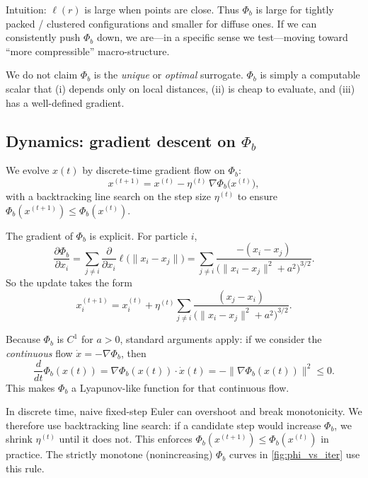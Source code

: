 \documentclass[11pt,a4paper]{article}
\numberwithin{equation}{section}
\newcommand{\norm}[1]{\lVert #1\rVert}
\newcommand{\phib}{\Phi_b}
\begin{document}
Intuition: $\ell(r)$ is large when points are close. Thus $\phib$ is large for tightly packed / clustered configurations and smaller for diffuse ones. If we can consistently push $\phib$ down, we are---in a specific sense we test---moving toward ``more compressible'' macro-structure.

We do not claim $\phib$ is the \emph{unique} or \emph{optimal} surrogate. $\phib$ is simply a computable scalar that (i) depends only on local distances, (ii) is cheap to evaluate, and (iii) has a well-defined gradient.

\subsection{Dynamics: gradient descent on $\phib$}
We evolve $x(t)$ by discrete-time gradient flow on $\phib$:
\begin{equation}
\label{eq:update}
x^{(t+1)} = x^{(t)} - \eta^{(t)} \, \nabla \phib \big( x^{(t)} \big),
\end{equation}
with a backtracking line search on the step size $\eta^{(t)}$ to ensure $\phib(x^{(t+1)}) \le \phib(x^{(t)})$.

The gradient of $\phib$ is explicit. For particle $i$,
\begin{equation}
\label{eq:gradphib}
\frac{\partial \phib}{\partial x_i}
= \sum_{j \neq i}
\frac{\partial}{\partial x_i}
\ell\!\big( \norm{x_i - x_j} \big)
= \sum_{j \neq i}
\frac{-(x_i - x_j)}{\big(\norm{x_i-x_j}^2 + a^2\big)^{3/2}}.
\end{equation}
So the update takes the form
\begin{equation}
\label{eq:force-like}
x_i^{(t+1)} =
x_i^{(t)} + \eta^{(t)} \sum_{j \neq i}
\frac{(x_j - x_i)}{\big(\norm{x_i-x_j}^2 + a^2\big)^{3/2}}.
\end{equation}

Because $\phib$ is $C^1$ for $a>0$, standard arguments apply: if we consider the \emph{continuous} flow $\dot x = -\nabla \phib$, then
\begin{equation}
\frac{d}{dt}\phib(x(t))
= \nabla \phib(x(t)) \cdot \dot x(t)
= - \norm{\nabla \phib(x(t))}^2 \le 0.
\end{equation}
This makes $\phib$ a Lyapunov-like function for that continuous flow.

In discrete time, naive fixed-step Euler can overshoot and break monotonicity. We therefore use backtracking line search: if a candidate step would increase $\phib$, we shrink $\eta^{(t)}$ until it does not. This enforces $\phib(x^{(t+1)}) \le \phib(x^{(t)})$ in practice. The strictly monotone (nonincreasing) $\phib$ curves in \cref{fig:phi_vs_iter} use this rule.
\end{document}
